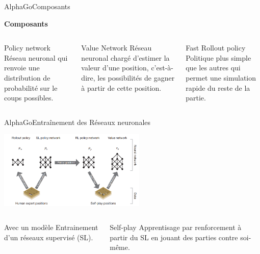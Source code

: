 \begin{frame}{AlphaGo}{Composants}
    \begin{center}
        \textbf{Composants}
    \end{center}
    \begin{columns}[t]
        \begin{column}{.3\textwidth}
            \begin{block}{Policy network}
                Réseau neuronal qui renvoie une distribution de probabilité sur le coups possibles.
            \end{block}
        \end{column}
        \begin{column}{.3\textwidth}
            \begin{block}{Value Network}
                Réseau neuronal chargé d'estimer la valeur d'une position, c'est-à-dire, les possibilités de gagner à partir de cette position.
            \end{block}
        \end{column}
        \begin{column}{.3\textwidth}
            \begin{block}{Fast Rollout policy}
                Politique plus simple que les autres qui permet une simulation rapide du reste de la partie.
            \end{block}
        \end{column}
    \end{columns}
\end{frame}

\begin{frame}{AlphaGo}{Entraînement des Réseaux neuronales}
    \begin{center}
        \includegraphics[width=7cm]{ressources/AlphaGo/Entrainement}
        \begin{columns}[t]
            \begin{column}{.4\textwidth}
                \begin{block}{Avec un modèle}
                    Entrainement d'un réseaux supervisé (SL).
                \end{block}
            \end{column}
            \begin{column}{.4\textwidth}
                \begin{block}{Self-play}
                    Apprentisage par renforcement à partir du SL en jouant des parties contre soi-même.
                \end{block}
            \end{column}
        \end{columns}

    \end{center}
\end{frame}


